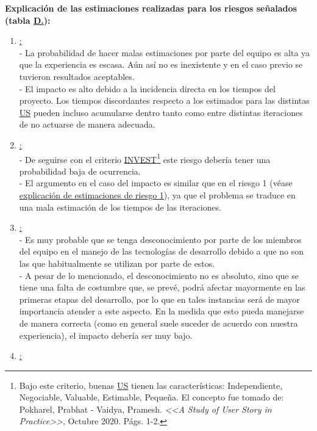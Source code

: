 \documentclass[a4paper, 12pt,twoside]{report}  %
\numberwithin{equation}{subsection} %
\begin{document}
\textbf{Explicación de las estimaciones realizadas para los riesgos señalados (tabla \hyperref[tabla_riesgos]{D.\tempTblRiesgos}):}
\begin{enumerate}
	\item \underline{\hypertarget{explicacion_estimacion_riesgo_uno}{}:}\\
	- La probabilidad de hacer malas estimaciones por parte del equipo es alta ya que la experiencia es escasa. Aún así no es inexistente y en el caso previo se tuvieron resultados aceptables.\\
	- El impacto es alto debido a la incidencia directa en los tiempos del proyecto. Los tiempos discordantes respecto a los estimados para las distintas \hyperlink{US}{US} pueden incluso acumularse dentro tanto como entre distintas iteraciones de no actuarse de manera adecuada.
	\item \underline{:}\\
	- De seguirse con el criterio \hyperlink{INVEST}{INVEST}\setcounter{footnote}{0}\footnote{Bajo este criterio, buenas \hyperlink{US}{US} tienen las características: Independiente, Negociable, Valuable, Estimable, Pequeña. El concepto fue tomado de: Pokharel, Prabhat - Vaidya, Pramesh. \textit{<<A Study of User Story in Practice>>}, Octubre 2020. Págs. 1-2.} este riesgo debería tener una probabilidad baja de ocurrencia.\\
	- El argumento en el caso del impacto es similar que en el riesgo 1 (véase \hyperlink{explicacion_estimacion_riesgo_uno}{explicación de estimaciones de riesgo 1}), ya que el problema se traduce en una mala estimación de los tiempos de las iteraciones.
	\item \underline{:}\\
	- Es muy probable que se tenga desconocimiento por parte de los miembros del equipo en el manejo de las tecnologías de desarrollo debido a que no son las que habitualmente se utilizan por parte de estos.\\
	- A pesar de lo mencionado, el desconocimiento no es absoluto, sino que se tiene una falta de costumbre que, se prevé, podrá afectar mayormente en las primeras etapas del desarrollo, por lo que en tales instancias será de mayor importancia atender a este aspecto. En la medida que esto pueda manejarse de manera correcta (como en general suele suceder de acuerdo con nuestra experiencia), el impacto debería ser muy bajo.
	\item \underline{:}\\

\end{enumerate}
\end{document}
